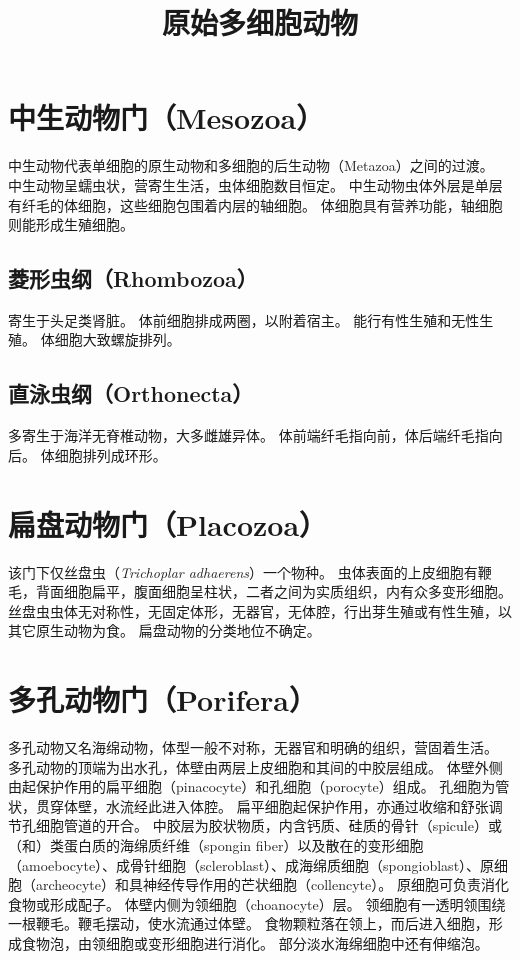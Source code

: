 \documentclass[11pt]{article}
\title{原始多细胞动物}
\date{}
\begin{document}
  \maketitle

  \linenumbers

\section{中生动物门（Mesozoa）}
中生动物代表单细胞的原生动物和多细胞的后生动物（Metazoa）之间的过渡。
中生动物呈蠕虫状，营寄生生活，虫体细胞数目恒定。
中生动物虫体外层是单层有纤毛的体细胞，这些细胞包围着内层的轴细胞。
体细胞具有营养功能，轴细胞则能形成生殖细胞。

\subsection{菱形虫纲（Rhombozoa）}
寄生于头足类肾脏。
体前细胞排成两圈，以附着宿主。
能行有性生殖和无性生殖。
体细胞大致螺旋排列。

\subsection{直泳虫纲（Orthonecta）}
多寄生于海洋无脊椎动物，大多雌雄异体。
体前端纤毛指向前，体后端纤毛指向后。
体细胞排列成环形。

\section{扁盘动物门（Placozoa）}
该门下仅丝盘虫（\textit{Trichoplar adhaerens}）一个物种。
虫体表面的上皮细胞有鞭毛，背面细胞扁平，腹面细胞呈柱状，二者之间为实质组织，内有众多变形细胞。
丝盘虫虫体无对称性，无固定体形，无器官，无体腔，行出芽生殖或有性生殖，以其它原生动物为食。
扁盘动物的分类地位不确定。
  
\section{多孔动物门（Porifera）}
多孔动物又名海绵动物，体型一般不对称，无器官和明确的组织，营固着生活。
多孔动物的顶端为出水孔，体壁由两层上皮细胞和其间的中胶层组成。
体壁外侧由起保护作用的扁平细胞（pinacocyte）和孔细胞（porocyte）组成。
孔细胞为管状，贯穿体壁，水流经此进入体腔。
扁平细胞起保护作用，亦通过收缩和舒张调节孔细胞管道的开合。
中胶层为胶状物质，内含钙质、硅质的骨针（spicule）或（和）类蛋白质的海绵质纤维（spongin fiber）以及散在的变形细胞（amoebocyte）、成骨针细胞（scleroblast）、成海绵质细胞（spongioblast）、原细胞（archeocyte）和具神经传导作用的芒状细胞（collencyte）。
原细胞可负责消化食物或形成配子。
体壁内侧为领细胞（choanocyte）层。
领细胞有一透明领围绕一根鞭毛。鞭毛摆动，使水流通过体壁。
食物颗粒落在领上，而后进入细胞，形成食物泡，由领细胞或变形细胞进行消化。
部分淡水海绵细胞中还有伸缩泡。
\end{document}
